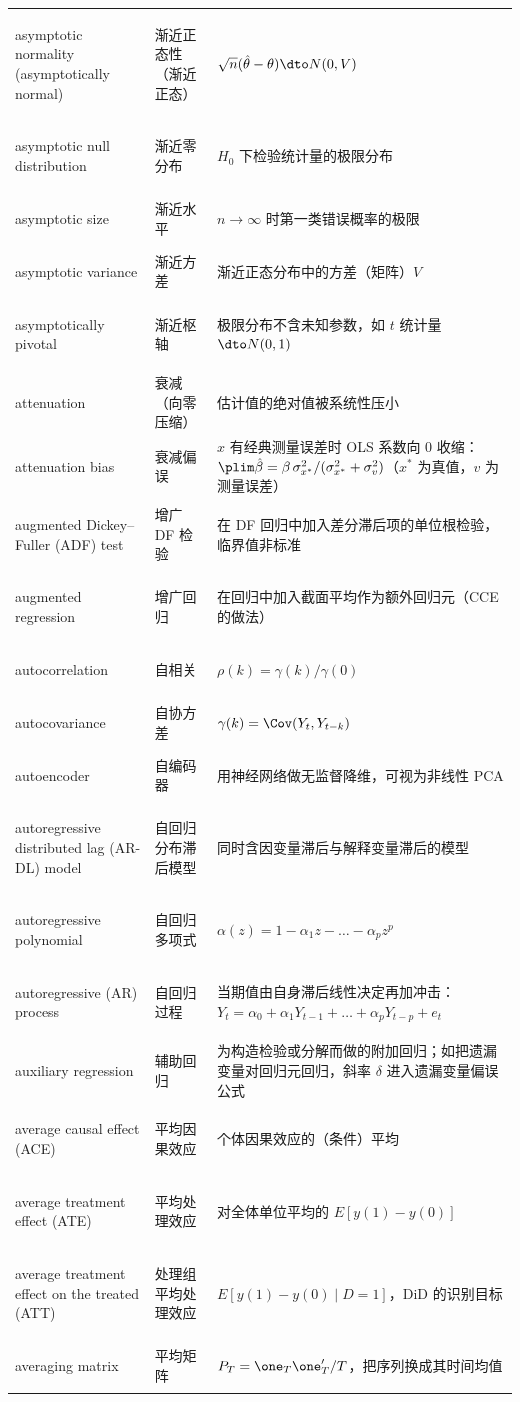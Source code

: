 \begin{longtable}{@{}>{\bfseries\boldmath\raggedright\arraybackslash}p{4.6cm}>{\raggedright\arraybackslash}p{3.2cm}>{\raggedright\arraybackslash}p{\dimexpr\textwidth-7.8cm-4\tabcolsep\relax}@{}}
asymptotic normality (asymptotically normal) & 渐近正态性（渐近正态） & $\sqrt n(\hat\theta-\theta)\dto N(0,V)$ \\
asymptotic null distribution & 渐近零分布 & $H_0$ 下检验统计量的极限分布 \\
asymptotic size & 渐近水平 & $n\to\infty$ 时第一类错误概率的极限 \\
asymptotic variance & 渐近方差 & 渐近正态分布中的方差（矩阵）$V$ \\
asymptotically pivotal & 渐近枢轴 & 极限分布不含未知参数，如 $t$ 统计量 $\dto N(0,1)$ \\
attenuation & 衰减（向零压缩） & 估计值的绝对值被系统性压小 \\
attenuation bias & 衰减偏误 & $x$ 有经典测量误差时 OLS 系数向 0 收缩：$\plim\hat\beta=\beta\,\sigma_{x^*}^2/(\sigma_{x^*}^2+\sigma_v^2)$（$x^*$ 为真值，$v$ 为测量误差） \\
augmented Dickey--Fuller (ADF) test & 增广 DF 检验 & 在 DF 回归中加入差分滞后项的单位根检验，临界值非标准 \\
augmented regression & 增广回归 & 在回归中加入截面平均作为额外回归元（CCE 的做法） \\
autocorrelation & 自相关 & $\rho(k)=\gamma(k)/\gamma(0)$ \\
autocovariance & 自协方差 & $\gamma(k)=\Cov(Y_t,Y_{t-k})$ \\
autoencoder & 自编码器 & 用神经网络做无监督降维，可视为非线性 PCA \\
autoregressive distributed lag (AR-DL) model & 自回归分布滞后模型 & 同时含因变量滞后与解释变量滞后的模型 \\
autoregressive polynomial & 自回归多项式 & $\alpha(z)=1-\alpha_1z-\dots-\alpha_pz^p$ \\
autoregressive (AR) process & 自回归过程 & 当期值由自身滞后线性决定再加冲击：$Y_t=\alpha_0+\alpha_1Y_{t-1}+\dots+\alpha_pY_{t-p}+e_t$ \\
auxiliary regression & 辅助回归 & 为构造检验或分解而做的附加回归；如把遗漏变量对回归元回归，斜率 $\delta$ 进入遗漏变量偏误公式 \\
average causal effect (ACE) & 平均因果效应 & 个体因果效应的（条件）平均 \\
average treatment effect (ATE) & 平均处理效应 & 对全体单位平均的 $E[y(1)-y(0)]$ \\
average treatment effect on the treated (ATT) & 处理组平均处理效应 & $E[y(1)-y(0)\mid D=1]$，DiD 的识别目标 \\
averaging matrix & 平均矩阵 & $P_T=\one_T\one_T'/T$，把序列换成其时间均值 \\
\end{longtable}

